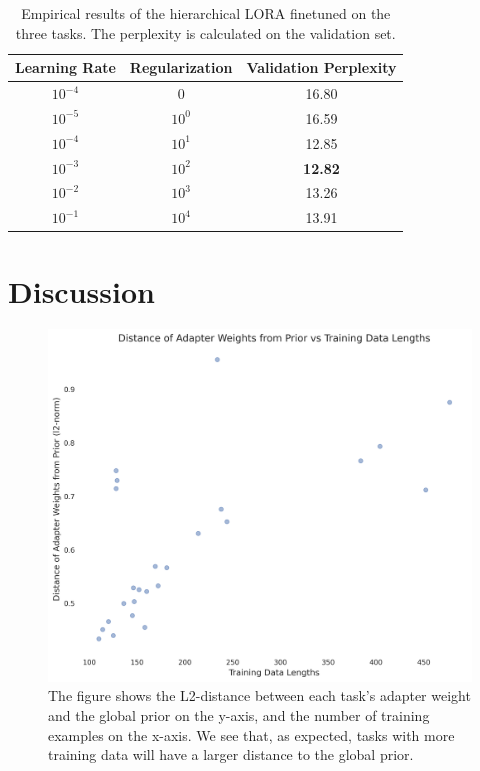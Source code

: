 \documentclass{article}
\begin{document}
\begin{table}[h]
\centering
\caption{Empirical results of the hierarchical LORA finetuned on the three tasks. The perplexity is calculated on the validation set.}
\label{tbl:results}
\begin{tabular}{ccc}
    \toprule
    Learning Rate & Regularization & Validation Perplexity \\
    \midrule
        $10^{-4}$ &              0 &                 16.80 \\
        $10^{-5}$ &       $10^{0}$ &                 16.59 \\
        $10^{-4}$ &       $10^{1}$ &                 12.85 \\
        $10^{-3}$ &       $10^{2}$ &                 \textbf{12.82} \\
        $10^{-2}$ &       $10^{3}$ &                 13.26 \\
        $10^{-1}$ &       $10^{4}$ &                 13.91 \\
    \bottomrule
    \end{tabular}
\end{table}

\section{Discussion}
\begin{figure}[h]
    \centering
    \includegraphics[width=\textwidth]{figures/weights_vs_data_lengths.png}
    \caption{The figure shows the L2-distance between each task's adapter weight and the global prior on the y-axis, and the number of training examples on the x-axis. We see that, as expected, tasks with more training data will have a larger distance to the global prior.}
    \label{fig:weights_vs_datalen} 
\end{figure}
\end{document}
